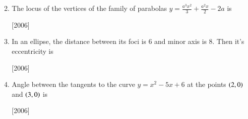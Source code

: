 \documentclass[journal,12pt,twocolumn]{IEEEtran}
\theoremstyle{remark}
\begin{document}
\begin{enumerate}
\begin{enumerate}[label=(\alph*)]
\begin{multicols}{2}
\end{multicols}
\end{enumerate}

\hfill

\item The locus of the vertices of the family of parabolas {$ y = \frac{a^3 x^2}{3} + \frac{a^2 x}{2} - 2a  $} is 

\hfill{[2006]}

\begin{enumerate}[label=(\alph*)]	
\end{enumerate}

\hfill

\item In an ellipse, the distance between its foci is 6 and minor axis is 8. Then it's eccentricity is

\hfill
\hfill{[2006]}

\begin{enumerate}[label=(\alph*)]
\end{enumerate}

\hfill

\item Angle between the tangents to the curve {$ y = x^2 -5x + 6 $} at the points {$ \left(2,0\right) $} and {$ \left(3,0\right) $} is

\hfill
\hfill{[2006]}


\begin{enumerate}[label=(\alph*)]
\end{enumerate}
\end{enumerate}
\end{document}
